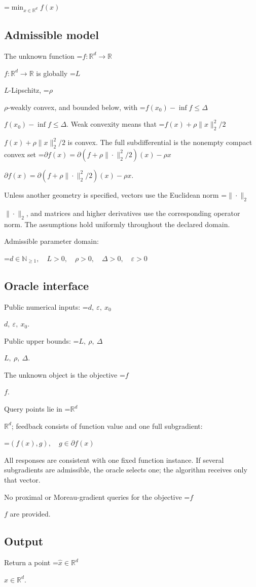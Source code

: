 \documentclass[10pt,a4paper]{article}
\newcommand{\AtlasMath}[1]{\par\begingroup\centering\setbox0=\hbox{$\displaystyle #1$}\ifdim\wd0>1.4\linewidth\typeout{ATLAS WIDE FORMULA: \the\wd0}\fi\ifdim\wd0>\linewidth\resizebox{\linewidth}{!}{\box0}\else\box0\fi\par\endgroup}
\newcommand{\AtlasInlineMath}[1]{\begingroup\setbox0=\hbox{$#1$}\ifdim\wd0>.4\linewidth\endgroup\AtlasMath{#1}\else\endgroup$#1$\fi}
\begin{document}
\AtlasMath{\min_{x\in \mathbb{R}^d}f(x)}


\subsection{Admissible model}
The unknown function \AtlasInlineMath{f:\mathbb R^d\to\mathbb R} is globally \AtlasInlineMath{L}-Lipschitz, \AtlasInlineMath{\rho}-weakly convex, and bounded below, with \AtlasInlineMath{f(x_0)-\inf f\le\Delta}. Weak convexity means that \AtlasInlineMath{f(x)+\rho\|x\|_2^2/2} is convex. The full subdifferential is the nonempty compact convex set \AtlasInlineMath{\partial f(x)=\partial(f+\rho\|\cdot\|_2^2/2)(x)-\rho x}.

Unless another geometry is specified, vectors use the Euclidean norm \AtlasInlineMath{\|\cdot\|_2}, and matrices and higher derivatives use the corresponding operator norm. The assumptions hold uniformly throughout the declared domain.

Admissible parameter domain:


\AtlasMath{d\in\mathbb{N}_{\ge1},\quad L>0,\quad \rho>0,\quad \Delta>0,\quad \varepsilon>0}


\subsection{Oracle interface}
Public numerical inputs: \AtlasInlineMath{d,\ \varepsilon,\ x_0}.

Public upper bounds: \AtlasInlineMath{L,\ \rho,\ \Delta}.

The unknown object is the objective \AtlasInlineMath{f}.

Query points lie in \AtlasInlineMath{\mathbb{R}^d}; feedback consists of function value and one full subgradient:


\AtlasMath{(f(x),g),\quad g\in\partial f(x)}


All responses are consistent with one fixed function instance. If several subgradients are admissible, the oracle selects one; the algorithm receives only that vector.

No proximal or Moreau-gradient queries for the objective \AtlasInlineMath{f} are provided.

\subsection{Output}
Return a point \AtlasInlineMath{\widehat x\in\mathbb R^d}.
\end{document}
